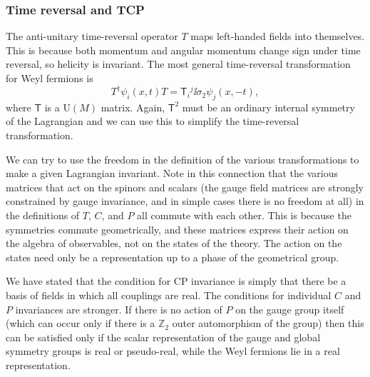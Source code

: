 \subsubsection{Time reversal and TCP}

The anti-unitary time-reversal operator $T$ maps left-handed fields into themselves.
This is because both momentum and angular momentum change sign under time
reversal, so helicity is invariant. The most general time-reversal transformation for Weyl
fermions is
\begin{equation*}
  T^\dagger\psi_i(x,t)T=\mathsf{T}_i{}^j\ii\sigma_2\psi_j(x,-t),
\end{equation*}
where $\mathsf{T}$ is a $\mathrm{U}(M)$ matrix. Again, $\mathsf{T}^2$ must be an ordinary internal symmetry of the
Lagrangian and we can use this to simplify the time-reversal transformation.

We can try to use the freedom in the definition of the various transformations to
make a given Lagrangian invariant. Note in this connection that the various matrices
that act on the spinors and scalars (the gauge field matrices are strongly constrained
by gauge invariance, and in simple cases there is no freedom at all) in the definitions
of $T$, $C$, and $P$ all commute with each other. This is because the symmetries commute
geometrically, and these matrices express their action on the algebra of observables,
not on the states of the theory. The action on the states need only be a representation
up to a phase of the geometrical group.

We have stated that the condition for CP invariance is simply that there be a basis of
fields in which all couplings are real. The conditions for individual $C$ and $P$ invariances
are stronger. If there is no action of $P$ on the gauge group itself (which can occur only
if there is a $\mathbb Z_2$ outer automorphism of the group) then this can be satisfied only if the
scalar representation of the gauge and global symmetry groups is real or pseudo-real,
while the Weyl fermions lie in a real representation.

